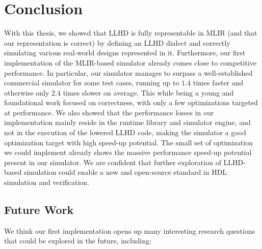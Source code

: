 
\chapter{Conclusion}
With this thesis, we showed that LLHD is fully representable in MLIR (and that our representation is correct) by defining an LLHD dialect and correctly simulating various real-world designs represented in it.
Furthermore, our first implementation of the MLIR-based simulator already comes close to competitive performance. In particular, our simulator manages to surpass a well-established commercial simulator for some test cases, running up to $1.4$ times faster and otherwise only $2.4$ times slower on average. This while being a young and foundational work focused on correctness, with only a few optimizations targeted at performance.
We also showed that the performance losses in our implementation mainly reside in the runtime library and simulator engine, and not in the execution of the lowered LLHD code, making the simulator a good optimization target with high speed-up potential. The small set of optimization we could implement already shows the massive performance speed-up potential present in our simulator. We are confident that further exploration of LLHD-based simulation could enable a new and open-source standard in HDL simulation and verification.


\section{Future Work}
We think our first implementation opens up many interesting research questions that could be explored in the future, including:

